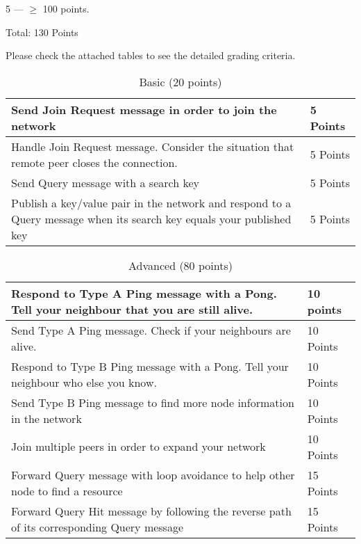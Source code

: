 \documentclass[12pt, a4paper]{article}
\begin{document}
5 --- $\ge$  100 points.

\vskip 20pt

Total: 130 Points

Please check the attached tables to see the detailed grading criteria.

\begin{table}[htdp]
\caption{Basic (20 points)}
\begin{center}
\begin{tabular}{|p{12cm}|p{2cm}|}
\hline
Send Join Request message in order to join the network & 5 Points \\
\hline
Handle Join Request message. Consider the situation that remote peer closes the connection. & 5 Points\\
\hline
Send Query message with a search key & 5 Points  \\
\hline
Publish a key/value pair in the network and respond to a Query message when its search key equals your published key & 5 Points \\
\hline
\end{tabular}
\end{center}
\end{table}

\begin{table}[htdp]
\caption{Advanced (80 points)}
\begin{center}
\begin{tabular}{|p{12cm}|p{2cm}|}
\hline
Respond to Type A Ping message with a Pong.
Tell your neighbour that you are still alive. & 10 points \\
\hline
Send Type A Ping message.
Check if your neighbours are alive. & 10 Points \\
\hline
Respond to Type B Ping message with a Pong.
Tell your neighbour who else you know. & 10 Points \\
\hline
Send Type B Ping message to find more node information in the network & 10 Points \\
\hline
Join multiple peers in order to expand your network & 10 Points \\
\hline
Forward Query message with loop avoidance to help other node to find a resource & 15 Points \\
\hline
Forward Query Hit message by following the reverse path of its corresponding Query message & 15 Points \\
\hline
\end{tabular}
\end{center}
\end{table}
\end{document}

